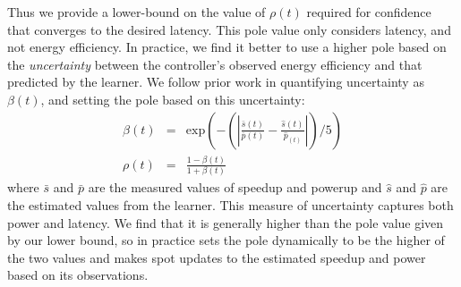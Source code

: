 Thus we provide a lower-bound on the value of $\rho(t)$ required for
confidence that \SYSTEM{} converges to the desired latency.  This
pole value only considers latency, and not energy efficiency.  In
practice, we find it better to use a higher pole based on the
\emph{uncertainty} between the controller's observed energy efficiency
and that predicted by the learner.  We follow prior work
\cite{Tokic2010} in quantifying uncertainty as $\beta(t)$, and setting
the pole based on this uncertainty:
\begin{equation}
  \begin{array}{rcl}
    \beta(t) &=&  \text{exp}{\left(- \left( \left|   \frac{\bar{s}(t)}{\bar{p}(t)}  -\frac{ \hat{s}(t)}{\hat{p}_(t)} \right| \right) /5\right)} \\
    \rho(t) &=& \frac{1-\beta(t)}{1+\beta(t)} 
  \end{array}
  \label{eqn:uncer}
\end{equation}
where $\bar{s}$ and $\bar{p}$ are the measured values of speedup and
powerup and $\hat{s}$ and $\hat{p}$ are the estimated values from the
learner.  This measure of uncertainty captures both power and
latency.  We find that it is generally higher than the pole value
given by our lower bound, so in practice \SYSTEM{} sets the pole
dynamically to be the higher of the two values and \SYSTEM{} makes
spot updates to the estimated speedup and power based on its
observations.

